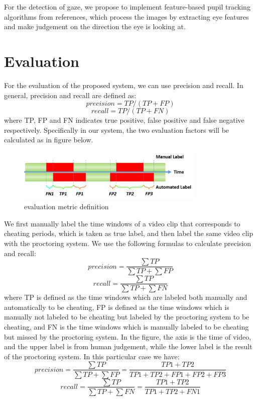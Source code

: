 \documentclass[11pt,letterpaper]{article}
\begin{document}
For the detection of gaze, we propose to implement feature-based pupil tracking algorithms from references, which process the images by extracting eye features and make judgement on the direction the eye is looking at\cite{c4,c5}.



\section{Evaluation}

For the evaluation of the proposed system, we can use precision and recall. In general, precision and recall are defined as:
$$precision = TP/(TP+FP)$$
$$recall = TP/(TP+FN)$$
where TP, FP and FN indicates true positive, false positive and false negative respectively. Specifically in our system, the two evaluation factors will be calculated as in figure below. 

\begin{figure}[htb!]
  \centering
    \includegraphics[width=0.8\textwidth]{timeline}
	\caption{evaluation metric definition}
\end{figure}

We first manually label the time windows of a video clip that corresponds to cheating periods, which is taken as true label, and then label the same video clip with the proctoring system. We use the following formulas to calculate precision and recall:
$$precision = \frac{\sum TP}{\sum TP + \sum FP}$$
$$recall = \frac{\sum TP}{\sum TP + \sum FN}$$
where TP is defined as the time windows which are labeled both manually and automatically to be cheating, FP is defined as the time windows which is manually not labeled to be cheating but labeled by the proctoring system to be cheating, and FN is the time windows which is manually labeled to be cheating but missed by the proctoring system. In the figure, the axis is the time of video, and the upper label is from human judgement, while the lower label is the result of the proctoring system. In this particular case we have:
$$precision = \frac{\sum TP}{\sum TP + \sum FP} = \frac{TP1+TP2}{TP1+TP2+FP1+FP2+FP3} $$
$$recall = \frac{\sum TP}{\sum TP + \sum FN} = \frac{TP1+TP2}{TP1+TP2+FN1}$$
\end{document}

